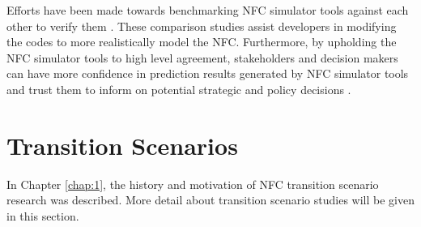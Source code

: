 Efforts have been made towards benchmarking \gls{NFC} simulator 
tools against each other to verify them 
\cite{feng_standardized_2016,guerin_benchmark_2009}. 
These comparison studies assist developers in modifying the
codes to more realistically model the \gls{NFC}. 
Furthermore, by upholding the \gls{NFC} simulator tools to high level 
agreement, 
stakeholders and decision makers can have more confidence in 
prediction results generated by \gls{NFC} simulator tools and trust them 
to inform on potential strategic and policy decisions
\cite{feng_standardized_2016}. 

\section{Transition Scenarios}
In Chapter \ref{chap:1}, the history and motivation of
\gls{NFC} transition scenario research was described.
More detail about transition scenario studies will be given 
in this section. 

